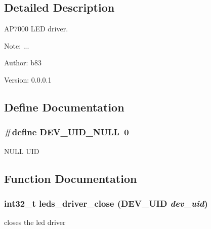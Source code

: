 \subsection{Detailed Description}
AP7000 LED driver. 

\begin{Desc}
\item[Note:]... \end{Desc}
\begin{Desc}
\item[Author:]b83 \end{Desc}
\begin{Desc}
\item[Version:]0.0.0.1 \end{Desc}


\subsection{Define Documentation}
\hypertarget{group___l_e_d___d_r_i_v_e_r_gda38030928bc5c3bdec6b7613fd3cab9}{
\subsubsection[{DEV\_\-UID\_\-NULL}]{\setlength{\rightskip}{0pt plus 5cm}\#define DEV\_\-UID\_\-NULL~0}}
\label{group___l_e_d___d_r_i_v_e_r_gda38030928bc5c3bdec6b7613fd3cab9}


NULL UID 

\subsection{Function Documentation}
\hypertarget{group___l_e_d___d_r_i_v_e_r_g1c9941f649946c996f3b22a47d809f94}{
\subsubsection[{leds\_\-driver\_\-close}]{\setlength{\rightskip}{0pt plus 5cm}int32\_\-t leds\_\-driver\_\-close ({\bf DEV\_\-UID} {\em dev\_\-uid})}}
\label{group___l_e_d___d_r_i_v_e_r_g1c9941f649946c996f3b22a47d809f94}


closes the led driver 

